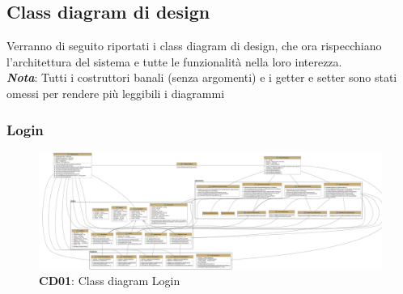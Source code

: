 \subsection{Class diagram di design}
    \begin{flushleft}
        Verranno di seguito riportati i class diagram di design, che ora rispecchiano l'architettura del sistema e tutte le funzionalità nella loro
        interezza. \\
        \emph{\textbf{Nota}}: Tutti i costruttori banali (senza argomenti) e i getter e setter sono stati omessi per rendere più leggibili 
        i diagrammi
    \end{flushleft}

    \subsubsection{Login}
        \begin{figure}[H]
            \centering
            \includegraphics[scale=0.12]{assets/diagrammi/Class diagram di design/ClassDiagram_Login.png}
            \caption*{\textbf{CD01}: Class diagram Login}\label{fig:ClassDiagram_Login}
        \end{figure}
    

